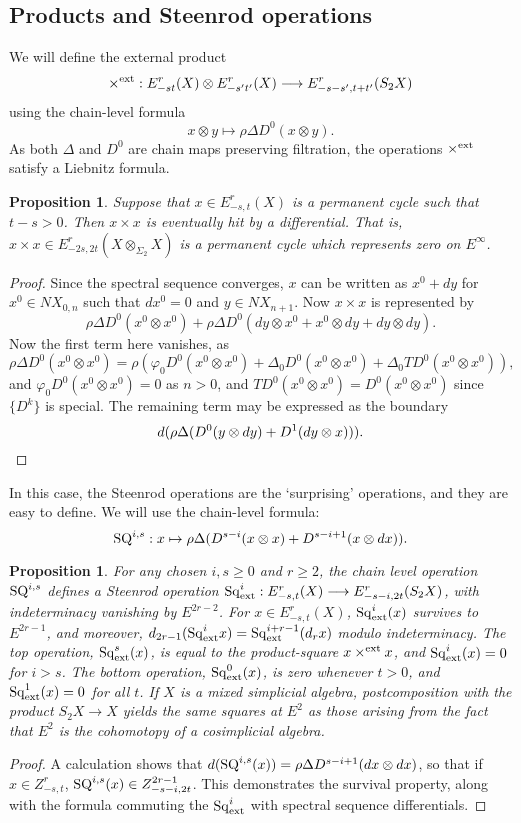 \documentclass[11pt]{amsart}
\theoremstyle{plain}
\newtheorem{prop}[thm]{Proposition}
\theoremstyle{definition}
\let\phi\varphi
\renewcommand{\to}{\longrightarrow}
\theoremstyle{plain}
\newcommand{\Sq}{\mathrm{Sq}}
\begin{document}
\begin{External spectral sequence operations}
\subsection{Products and Steenrod operations}
We will define the external product
\[\times^\textup{ext}:E^r_{-st}(X)\otimes E^r_{-s't'}(X)\to E^r_{-s-s',t+t'}(S_2X)\]
using the chain-level formula
\[x\otimes y\mapsto\rho\Delta D^0(x\otimes y).\]
As both $\Delta$ and $D^0$ are chain maps preserving filtration, the operations $\times^\textup{ext}$ satisfy a Liebnitz formula.
\begin{prop}
Suppose that $x\in E^r_{-s,t}(X)$ is a permanent cycle such that $t-s>0$. Then $x\times x$ is eventually hit by a differential. That is, $x\times x\in E^r_{-2s,2t}(X\otimes_{\Sigma_2}X)$ is a permanent cycle which represents zero on $E^\infty$.
\end{prop}
\begin{proof}
Since the spectral sequence converges, $x$ can be written as $x^0+dy$ for $x^0\in NX_{0,n}$ such that $dx^0=0$ and $y\in NX_{n+1}$. Now $x\times x$ is represented by
\[\rho\Delta D^0(x^0\otimes x^0)+\rho\Delta D^0(dy\otimes x^0+x^0\otimes dy+dy\otimes dy).\]
Now the first term here vanishes, as
\[\rho\Delta D^0(x^0\otimes x^0)=\rho(\phi_0 D^0(x^0\otimes x^0)+\Delta_0 D^0(x^0\otimes x^0)+\Delta_0 TD^0(x^0\otimes x^0)),\]
and $\phi_0D^0(x^0\otimes x^0)=0$ as $n>0$, and $TD^0(x^0\otimes x^0)=D^0(x^0\otimes x^0)$ since $\{D^k\}$ is special. The remaining term may be expressed as the boundary
\[d(\rho\Delta(D^0(y\otimes dy)+D^1(dy\otimes x))).\qedhere\]
\end{proof}

In this case, the Steenrod operations are the `surprising' operations, and they are easy to define. We will use the chain-level formula:
\[\textup{SQ}^{i,s}:x\mapsto \rho\Delta (D^{s-i}(x\otimes x)+D^{s-i+1}(x\otimes dx)).\]
\begin{prop}
For any chosen $i,s\geq0$ and $r\geq2$, the chain level operation $\textup{SQ}^{i,s}$ defines a Steenrod operation $\Sq^i_\textup{ext}:E^r_{-s,t}(X)\to E^r_{-s-i,2t}(S_2X)$, with indeterminacy vanishing by $E^{2r-2}$. For $x\in E^r_{-s,t}(X)$, $\Sq^i_\textup{ext}(x)$ survives to $E^{2r-1}$, and moreover, $d_{2r-1}(\Sq^i_\textup{ext}x)=\Sq^{i+r-1}_\textup{ext}(d_rx)$ modulo indeterminacy. The top operation, $\Sq^s_\textup{ext}(x)$, is equal to the product-square $x\times^\textup{ext} x$, and $\Sq^i_\textup{ext}(x)=0$ for $i>s$. The bottom operation, $\Sq^0_\textup{ext}(x)$, is zero whenever $t>0$, and $\Sq^1_\textup{ext}(x)=0$ for all $t$. If $X$ is a mixed simplicial algebra, postcomposition with the product $S_2X\to X$ yields the same squares at $E^2$ as those arising from the fact that $E^2$ is the cohomotopy of a cosimplicial algebra.
\end{prop}
\begin{proof}
A calculation shows that $d(\textup{SQ}^{i,s}(x))=\rho\Delta D^{s-i+1}(dx\otimes dx)$, so that if $x\in Z^r_{-s,t}$, $\textup{SQ}^{i,s}(x)\in Z^{2r-1}_{-s-i,2t}$. This demonstrates the survival property, along with the formula commuting the $\Sq^i_\textup{ext}$ with spectral sequence differentials.


\end{proof}
\end{External spectral sequence operations}
\end{document}

